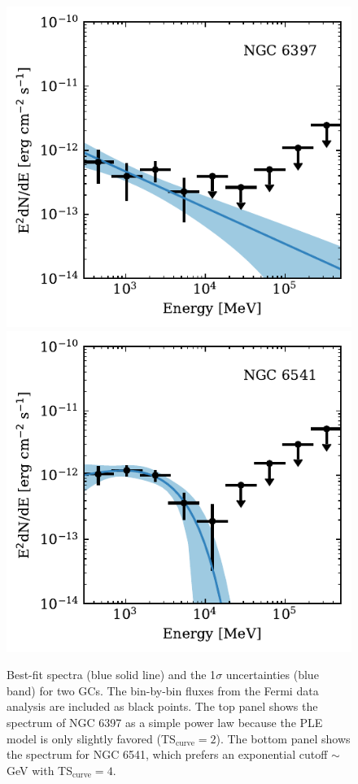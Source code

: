 \documentclass[doublespace,nopageskip]{VTthesis} %
\begin{document}
\begin{figure}
    \centering
    \includegraphics[width=1\columnwidth]{Figures/Globular/spectra/PL_spectrum_16.pdf}
    \includegraphics[width=1\columnwidth]{Figures/Globular/spectra/PLE_spectrum_21.pdf}
    \caption{Best-fit spectra (blue solid line) and the 1$\sigma$ uncertainties (blue band) for two GCs. The bin-by-bin fluxes from the Fermi data analysis are included as black points. The top panel shows the spectrum of NGC 6397 as a simple power law because the PLE model is only slightly favored (TS$_\mathrm{curve} = 2$). The bottom panel shows the spectrum for NGC 6541, which prefers an exponential cutoff $\sim$ GeV with TS$_\mathrm{curve} = 4$.}
    \label{fig:spectra_example}
\end{figure}
\end{document}
